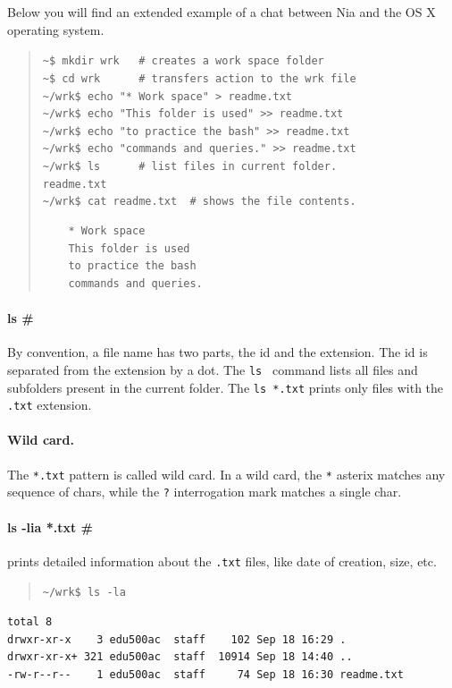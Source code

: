 \documentclass[a4paper,12pt]{book}
\begin{document}
Below you will find
an extended example of a chat between Nia and
the OS X operating system.
\begin{quote}
	\verb|~$ mkdir wrk   # creates a work space folder      | \\
	\verb|~$ cd wrk      # transfers action to the wrk file | \\
	\verb|~/wrk$ echo "* Work space" > readme.txt | \\
	\verb|~/wrk$ echo "This folder is used" >> readme.txt |\\
	\verb|~/wrk$ echo "to practice the bash" >> readme.txt | \\
	\verb|~/wrk$ echo "commands and queries." >> readme.txt | \\
	\verb|~/wrk$ ls      # list files in current folder. | \\
	\verb|readme.txt |\\
	\verb|~/wrk$ cat readme.txt  # shows the file contents.| 
	\begin{verbatim}
	* Work space
	This folder is used
	to practice the bash
	commands and queries.
	\end{verbatim}
\end{quote}

\paragraph{ls \#} 
By convention, a file name has
two parts, the id and the extension. The id
is separated from the extension by a dot.
The \verb|ls | command lists all files
and subfolders present in the current folder.
The \verb|ls *.txt| prints only files
with the \verb|.txt| extension.

\paragraph{Wild card.} The 
\verb|*.txt| pattern
is called wild card.
In a wild card, the \verb|*| asterix matches
any sequence of chars, while the \verb|?|
interrogation mark matches a single char.

\paragraph{ls -lia *.txt \#} prints detailed
information about the \verb|.txt| files,
like date of creation, size, etc.
\begin{quote}
	\verb|~/wrk$ ls -la |  
\end{quote}
\begin{verbatim}
total 8
drwxr-xr-x    3 edu500ac  staff    102 Sep 18 16:29 .
drwxr-xr-x+ 321 edu500ac  staff  10914 Sep 18 14:40 ..
-rw-r--r--    1 edu500ac  staff     74 Sep 18 16:30 readme.txt
\end{verbatim}
\end{document}
